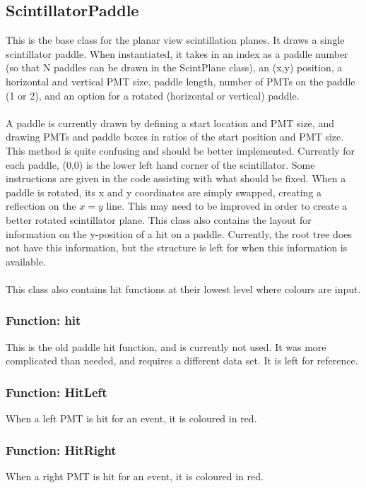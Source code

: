 \documentclass[12pt]{article}
\numberwithin{equation}{section}
\begin{document}
\subsection{ScintillatorPaddle}
This is the base class for the planar view scintillation planes. It draws a single scintillator paddle. When instantiated, it takes in an index as a paddle number (so that N paddles can be drawn in the ScintPlane class), an (x,y) position, a horizontal and vertical PMT size, paddle length, number of PMTs on the paddle (1 or 2), and an option for a rotated (horizontal or vertical) paddle.
\\
\\
A paddle is currently drawn by defining a start location and PMT size, and drawing PMTs and paddle boxes in ratios of the start position and PMT size. This method is quite confusing and should be better implemented. Currently for each paddle, (0,0) is the lower left hand corner of the scintillator. Some instructions are given in the code assisting with what should be fixed. When a paddle is rotated, its x and y coordinates are simply swapped, creating a reflection on the $x=y$ line. This may need to be improved in order to create a better rotated scintillator plane. This class also contains the layout for information on the y-position of a hit on a paddle. Currently, the root tree does not have this information, but the structure is left for when this information is available.
\\
\\
This class also contains hit functions at their lowest level where colours are input.

\subsubsection{Function: hit}
This is the old paddle hit function, and is currently not used. It was more complicated than needed, and requires a different data set. It is left for reference.

\subsubsection{Function: HitLeft}
When a left PMT is hit for an event, it is coloured in red.

\subsubsection{Function: HitRight}
When a right PMT is hit for an event, it is coloured in red.
 
\end{document}
